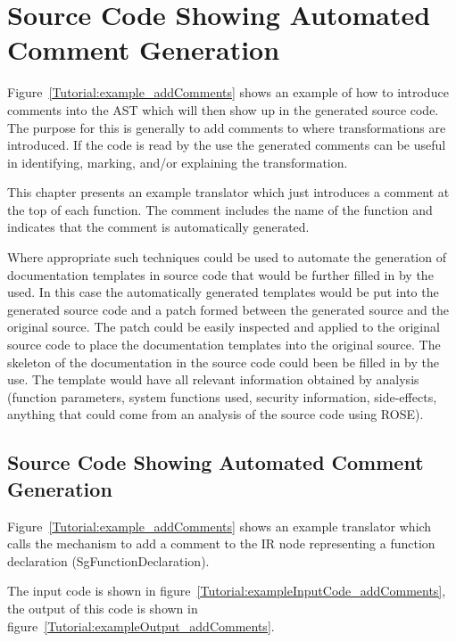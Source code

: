 \section{Source Code Showing Automated Comment Generation}

   Figure~\ref{Tutorial:example_addComments} shows an
example of how to introduce comments into the AST which will
then show up in the generated source code. The purpose for this is
generally to add comments to where transformations are introduced.
If the code is read by the use the generated comments can be
useful in identifying, marking, and/or explaining the transformation.

This chapter presents an example translator which just introduces a 
comment at the top of each function.  The comment includes the
name of the function and indicates that the comment is automatically 
generated.

Where appropriate such techniques could be used to automate the 
generation of documentation templates in source code that would be
further filled in by the used.  In this case the automatically generated
templates would be put into the generated source code and a patch formed
between the generated source and the original source.  The patch could
be easily inspected and applied to the original source code to place
the documentation templates into the original source.  The skeleton
of the documentation in the source code could been be filled in by
the use.  The template would have all relevant information obtained by analysis
(function parameters, system functions used, security information, side-effects,
anything that could come from an analysis of the source code using ROSE).

\subsection{Source Code Showing Automated Comment Generation}

    Figure~\ref{Tutorial:example_addComments}
shows an example translator which calls the mechanism to 
add a comment to the IR node representing a function declaration (SgFunctionDeclaration).

The input code is shown in figure~\ref{Tutorial:exampleInputCode_addComments},
the output of this code is shown in 
figure~\ref{Tutorial:exampleOutput_addComments}.

